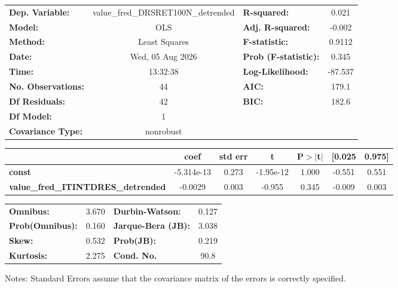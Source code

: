 \begin{center}
\begin{tabular}{lclc}
\toprule
\textbf{Dep. Variable:}                    & value\_fred\_DRSRET100N\_detrended & \textbf{  R-squared:         } &     0.021   \\
\textbf{Model:}                            &                OLS                 & \textbf{  Adj. R-squared:    } &    -0.002   \\
\textbf{Method:}                           &           Least Squares            & \textbf{  F-statistic:       } &    0.9112   \\
\textbf{Date:}                             &          Wed, 05 Aug 2026          & \textbf{  Prob (F-statistic):} &    0.345    \\
\textbf{Time:}                             &              13:32:38              & \textbf{  Log-Likelihood:    } &   -87.537   \\
\textbf{No. Observations:}                 &                   44               & \textbf{  AIC:               } &     179.1   \\
\textbf{Df Residuals:}                     &                   42               & \textbf{  BIC:               } &     182.6   \\
\textbf{Df Model:}                         &                    1               & \textbf{                     } &             \\
\textbf{Covariance Type:}                  &             nonrobust              & \textbf{                     } &             \\
\bottomrule
\end{tabular}
\begin{tabular}{lcccccc}
                                           & \textbf{coef} & \textbf{std err} & \textbf{t} & \textbf{P$> |$t$|$} & \textbf{[0.025} & \textbf{0.975]}  \\
\midrule
\textbf{const}                             &   -5.314e-13  &        0.273     & -1.95e-12  &         1.000        &       -0.551    &        0.551     \\
\textbf{value\_fred\_ITINTDRES\_detrended} &      -0.0029  &        0.003     &    -0.955  &         0.345        &       -0.009    &        0.003     \\
\bottomrule
\end{tabular}
\begin{tabular}{lclc}
\textbf{Omnibus:}       &  3.670 & \textbf{  Durbin-Watson:     } &    0.127  \\
\textbf{Prob(Omnibus):} &  0.160 & \textbf{  Jarque-Bera (JB):  } &    3.038  \\
\textbf{Skew:}          &  0.532 & \textbf{  Prob(JB):          } &    0.219  \\
\textbf{Kurtosis:}      &  2.275 & \textbf{  Cond. No.          } &     90.8  \\
\bottomrule
\end{tabular}
\end{center}

Notes: \newline
 [1] Standard Errors assume that the covariance matrix of the errors is correctly specified.